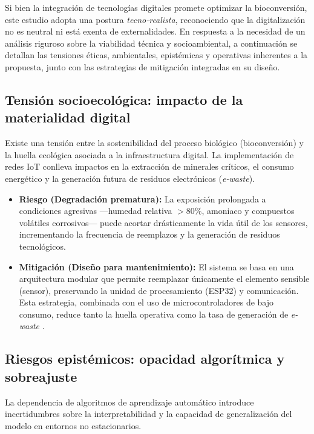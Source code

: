 Si bien la integración de tecnologías digitales promete optimizar la bioconversión, este estudio adopta una postura \textit{tecno-realista}, reconociendo que la digitalización no es neutral ni está exenta de externalidades. En respuesta a la necesidad de un análisis riguroso sobre la viabilidad técnica y socioambiental, a continuación se detallan las tensiones éticas, ambientales, epistémicas y operativas inherentes a la propuesta, junto con las estrategias de mitigación integradas en su diseño.

\subsection{Tensión socioecológica: impacto de la materialidad digital}
Existe una tensión entre la sostenibilidad del proceso biológico (bioconversión) y la huella ecológica asociada a la infraestructura digital. La implementación de redes IoT conlleva impactos en la extracción de minerales críticos, el consumo energético y la generación futura de residuos electrónicos (\textit{e-waste}).

\begin{itemize}
    \item \textbf{Riesgo (Degradación prematura):} La exposición prolongada a condiciones agresivas —humedad relativa $>80\%$, amoniaco y compuestos volátiles corrosivos— puede acortar drásticamente la vida útil de los sensores, incrementando la frecuencia de reemplazos y la generación de residuos tecnológicos.
    \item \textbf{Mitigación (Diseño para mantenimiento):} El sistema se basa en una arquitectura modular que permite reemplazar únicamente el elemento sensible (sensor), preservando la unidad de procesamiento (ESP32) y comunicación. Esta estrategia, combinada con el uso de microcontroladores de bajo consumo, reduce tanto la huella operativa como la tasa de generación de \textit{e-waste} \parencite{dharCarbonImpactArtificial2020}.
\end{itemize}

\subsection{Riesgos epistémicos: opacidad algorítmica y sobreajuste}
La dependencia de algoritmos de aprendizaje automático introduce incertidumbres sobre la interpretabilidad y la capacidad de generalización del modelo en entornos no estacionarios.



